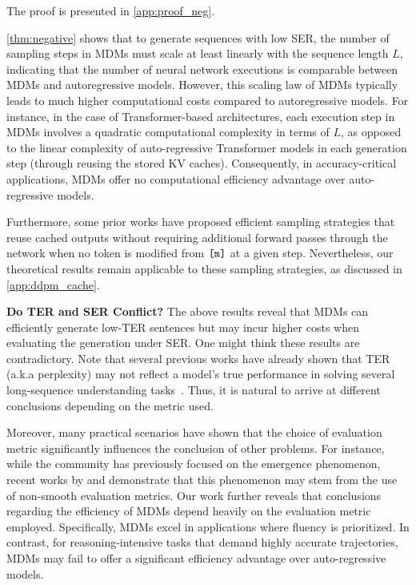 The proof is presented in \cref{app:proof_neg}.

\cref{thm:negative} shows that to generate sequences with low SER, the number of sampling steps in MDMs must scale at least linearly with the sequence length $L$, indicating that the number of neural network executions is comparable between MDMs and autoregressive models. However, this scaling law of MDMs typically leads to much higher computational costs compared to autoregressive models. For instance, in the case of Transformer-based architectures, each execution step in MDMs involves a quadratic computational complexity in terms of $L$, as opposed to the linear complexity of auto-regressive Transformer models in each generation step (through reusing the stored KV caches). Consequently, in accuracy-critical applications, MDMs offer no computational efficiency advantage over auto-regressive models. 

Furthermore, some prior works \citep{sahoo2024simple,ou2024your} have proposed efficient sampling strategies that reuse cached outputs without requiring additional forward passes through the network when no token is modified from $\texttt{[m]}$ at a given step. Nevertheless, our theoretical results remain applicable to these sampling strategies, as discussed in \cref{app:ddpm_cache}.


\textbf{Do TER and SER Conflict?} The above results reveal that MDMs can efficiently generate low-TER sentences but may incur higher costs when evaluating the generation under SER. One might think these results are contradictory. Note that several previous works have already shown that TER (a.k.a perplexity) may not reflect a model's true performance in solving several long-sequence understanding tasks~\citep{Huang2022OnTL,hu2024perplexityreflectlargelanguage,luden2024beyond}. Thus, it is natural to arrive at different conclusions depending on the metric used. 

Moreover, many practical scenarios have shown that the choice of evaluation metric significantly influences the conclusion of other problems. For instance, while the community has previously focused on the emergence phenomenon, recent works by \citet{wei2022emergent} and \citet{schaeffer2024emergent} demonstrate that this phenomenon may stem from the use of non-smooth evaluation metrics. Our work further reveals that conclusions regarding the efficiency of MDMs depend heavily on the evaluation metric employed. Specifically, MDMs excel in applications where fluency is prioritized. In contrast, for reasoning-intensive tasks that demand highly accurate trajectories, MDMs may fail to offer a significant efficiency advantage over auto-regressive models.

